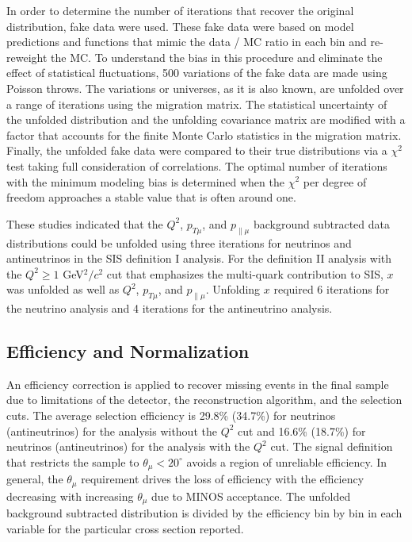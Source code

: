 \documentclass[aps, prd, twocolumn, showpacs, superscriptaddress, floatfix]{revtex4-2}
\begin{document}
In order to determine the number of iterations that recover the original distribution, fake data were used. These fake data were based on model predictions and functions that mimic the data / MC ratio in each bin and re-reweight the MC. To understand the bias in this procedure and eliminate the effect of statistical fluctuations, 500 variations of the fake data are made using Poisson throws. The variations or universes, as it is also known, are unfolded over a range of iterations using the migration matrix. The statistical uncertainty of the unfolded distribution and the unfolding covariance matrix are modified with a factor that accounts for the finite Monte Carlo statistics in the migration matrix. Finally, the unfolded fake data were compared to their true distributions via a $\chi^2$ test taking full consideration of correlations. The optimal number of iterations with the minimum modeling bias is determined when the $\chi^2$ per degree of freedom approaches a stable value that is often around one.

These studies indicated that the $Q^2$, $p_{T\mu}$, and $p_{\parallel\mu}$ background subtracted data distributions could be unfolded using three iterations for neutrinos and antineutrinos in the SIS definition I analysis.  For the definition II analysis with the $Q^2 \geq 1$ GeV$^2/c^2$ cut that emphasizes the multi-quark contribution to SIS, $x$ was unfolded as well as $Q^2$, $p_{T\mu}$, and $p_{\parallel\mu}$. Unfolding $x$ required 6 iterations for the neutrino analysis and 4 iterations for the antineutrino analysis.

\subsection{Efficiency and Normalization}
An efficiency correction is applied to recover missing events in the final sample due to limitations of the detector, the reconstruction algorithm, and the selection cuts. The average selection efficiency is 29.8\% (34.7\%) for neutrinos (antineutrinos) for the analysis without the $Q^2$ cut and 16.6\% (18.7\%) for neutrinos (antineutrinos) for the analysis with the $Q^2$ cut. The signal definition that restricts the sample to $\theta_\mu < 20^\circ$ avoids a region of unreliable efficiency. In general, the $\theta_\mu$ requirement drives the loss of efficiency with the efficiency decreasing with increasing $\theta_\mu$ due to MINOS acceptance. The unfolded background subtracted distribution is divided by the efficiency bin by bin in each variable for the particular cross section reported. 
\end{document}
